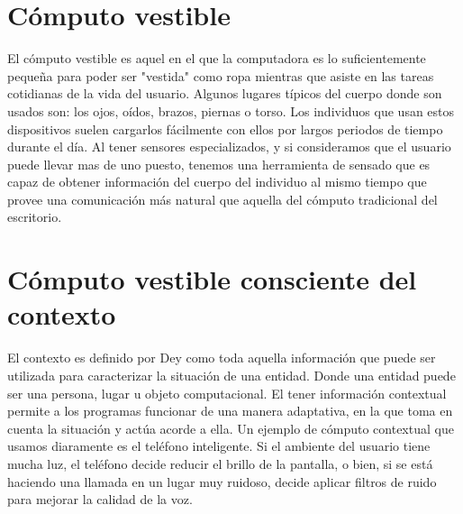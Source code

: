 \documentclass[letterpaper,12pt]{cicese}
\begin{document}
			\section{C\'omputo vestible}
				El c\'omputo vestible es aquel en el que la computadora es lo suficientemente peque\~na para poder ser "vestida" como ropa mientras que asiste en las
				tareas cotidianas de la vida del usuario\citep{Starner97augmentedreality}. Algunos lugares t\'ipicos del cuerpo donde son usados son: los ojos, o\'idos, brazos, piernas o torso.
				Los individuos que usan estos dispositivos suelen cargarlos f\'acilmente con ellos por largos periodos de tiempo durante el d\'ia. Al tener sensores
				especializados, y si consideramos que el usuario puede llevar mas de uno puesto, tenemos una herramienta de sensado que es capaz de obtener
				informaci\'on del cuerpo del individuo al mismo tiempo que provee una comunicaci\'on m\'as natural que aquella del c\'omputo tradicional del escritorio.


			\section{C\'omputo vestible consciente del contexto}

				El contexto es definido por Dey \citep{Dey2001} como toda aquella informaci\'on que puede ser utilizada para caracterizar la situaci\'on de una entidad. Donde una
				entidad puede ser una persona, lugar u objeto computacional. El tener informaci\'on contextual permite a los programas funcionar de una manera adaptativa,
				en la que toma en cuenta la situaci\'on y act\'ua acorde a ella. Un ejemplo de c\'omputo contextual que usamos diaramente es el tel\'efono inteligente.
				Si el ambiente del usuario tiene mucha luz, el tel\'efono decide reducir el brillo de la pantalla, o bien, si se est\'a haciendo una llamada en un lugar muy ruidoso,
				decide aplicar filtros de ruido para mejorar la calidad de la voz.
		
\end{document}

